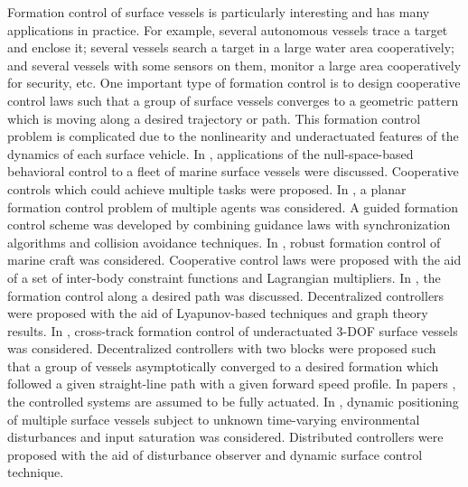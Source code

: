 \documentclass[letterpaper, 10 pt, conference]{ieeeconf}  %
\begin{document}
Formation control of surface vessels is particularly interesting and
has many applications in practice. For example, several autonomous vessels trace a target and enclose it; several vessels search a target in a large water area cooperatively; and several vessels with some sensors on them, monitor a large area cooperatively for security, etc.
One important type of
formation control  is to design cooperative control
laws such that a group of surface vessels converges to a  geometric
pattern which is moving along a desired trajectory or path. This formation control problem is complicated due to the nonlinearity and underactuated features of 
the dynamics of each surface vehicle.  In
\cite{arr06,arr061}, applications of the null-space-based behavioral
control to a fleet of marine surface vessels were discussed.
Cooperative controls which could achieve multiple tasks were
proposed. In \cite{bre06}, a planar formation control problem of
multiple agents was considered. A guided formation control scheme
was developed by combining guidance laws with synchronization
algorithms and collision avoidance techniques. In \cite{ihl06},
robust formation control of marine craft was considered. Cooperative
control laws were proposed with the aid of a set of inter-body
constraint functions and Lagrangian multipliers.
 In \cite{agu06}, the formation control along a desired path was
 discussed. Decentralized controllers were proposed with the aid of
 Lyapunov-based techniques and graph
theory results.  In \cite{bor06}, cross-track formation control of
underactuated 3-DOF surface vessels was considered. Decentralized
controllers with two blocks were proposed such that a group of
vessels asymptotically converged to a desired formation which
followed a given straight-line path with a given forward speed
profile. In papers \cite{arr06,arr061,bre06,ihl06}, the controlled
systems are assumed to be fully actuated. In \cite{Xia2019}, dynamic positioning of multiple surface vessels subject to unknown time-varying environmental disturbances and input saturation was considered. Distributed controllers were proposed with the aid of disturbance observer and dynamic surface control technique.
\end{document}
